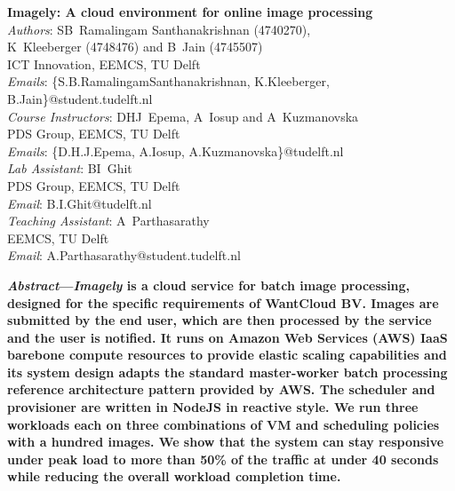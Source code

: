 \documentclass[a4paper]{IEEEtran}
\begin{document}
\setlength{\tabcolsep}{10pt}
\renewcommand{\arraystretch}{1.25}

\begin{center}
  \textbf{\Large{
    Imagely: A cloud environment for online image processing
  }}\\
  \vspace{0.25cm}
  \emph{Authors}: SB~Ramalingam Santhanakrishnan (4740270), \\ K~Kleeberger (4748476) and B~Jain (4745507)\\
  ICT Innovation, EEMCS, TU Delft\\
  \emph{Emails}: \{S.B.RamalingamSanthanakrishnan, K.Kleeberger, B.Jain\}@student.tudelft.nl\\
  \vspace{0.2cm}
  \emph{Course Instructors}: DHJ~Epema, A~Iosup and A~Kuzmanovska\\
  PDS Group, EEMCS, TU Delft\\
  \emph{Emails}: \{D.H.J.Epema, A.Iosup, A.Kuzmanovska\}@tudelft.nl\\
  \vspace{0.2cm}
  \emph{Lab Assistant}: BI~Ghit\\
  PDS Group, EEMCS, TU Delft\\
  \emph{Email}: B.I.Ghit@tudelft.nl\\
  \vspace{0.2cm}
  \emph{Teaching Assistant}: A~Parthasarathy\\
  EEMCS, TU Delft\\
  \emph{Email}: A.Parthasarathy@student.tudelft.nl\\
\end{center}

\vspace{0.2cm}

\textbf{
  \emph{Abstract}---\emph{Imagely} is a cloud service for batch image processing, designed for the specific requirements of WantCloud BV. Images are submitted by the end user, which are then processed by the service and the user is notified. It runs on Amazon Web Services (AWS) IaaS barebone compute resources to provide elastic scaling capabilities and its system design adapts the standard master-worker batch processing reference architecture pattern provided by AWS. The scheduler and provisioner are written in NodeJS in reactive style. We run three workloads each on three combinations of VM and scheduling policies with a hundred images. We show that the system
  can stay responsive under peak load to more than 50\% of the traffic at under 40 seconds while reducing the overall workload completion time. 
}
\end{document}
